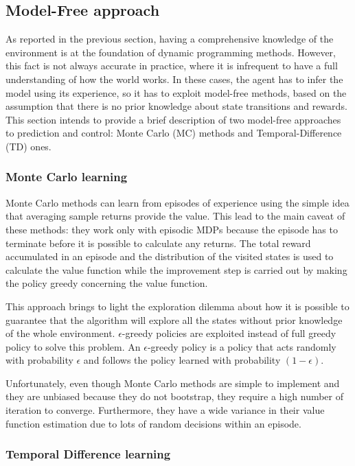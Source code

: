 \subsection{Model-Free approach}

As reported in the previous section, having a comprehensive knowledge of the environment is at the foundation of dynamic programming methods. However, this fact is not always accurate in practice, where it is infrequent to have a full understanding of how the world works. In these cases, the agent has to infer the model using its experience, so it has to exploit model-free methods, based on the assumption that there is no prior knowledge about state transitions and rewards.
This section intends to provide a brief description of two model-free approaches to prediction and control: Monte Carlo (MC) methods and Temporal-Difference (TD) ones.

\subsubsection{Monte Carlo learning}

Monte Carlo methods \cite[Chapter 6]{sutton2018reinforcement} can learn from episodes of experience using the simple idea that averaging sample returns provide the value. This lead to the main caveat of these methods: they work only with episodic MDPs because the episode has to terminate before it is possible to calculate any returns.
The total reward accumulated in an episode and the distribution of the visited states is used to calculate the value function while the improvement step is carried out by making the policy greedy concerning the value function.

This approach brings to light the exploration dilemma about how it is possible to guarantee that the algorithm will explore all the states without prior knowledge of the whole environment. $\epsilon$-greedy policies are exploited instead of full greedy policy to solve this problem.
An $\epsilon$-greedy policy is a policy that acts randomly with probability $\epsilon$ and follows the policy learned with probability $(1-\epsilon)$.

Unfortunately, even though Monte Carlo methods are simple to implement and they are unbiased because they do not bootstrap, they require a high number of iteration to converge. Furthermore, they have a wide variance in their value function estimation due to lots of random decisions within an episode.

\subsubsection{Temporal Difference learning}

